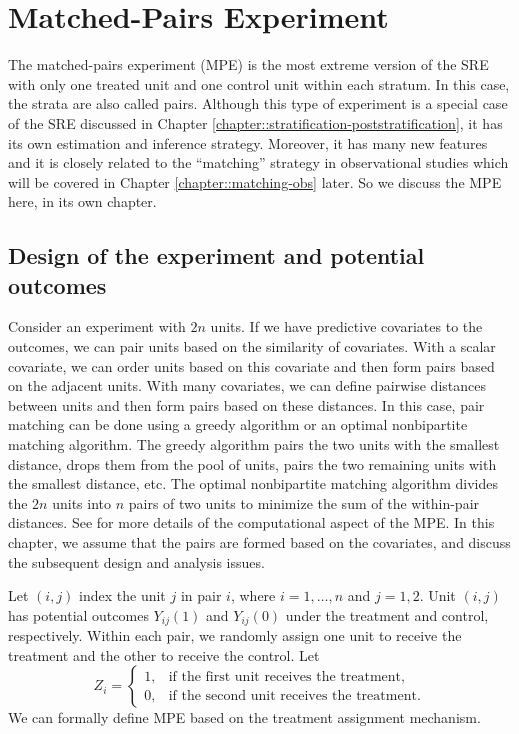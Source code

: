 
\chapter{Matched-Pairs Experiment}
 \label{chapter::mpe}
 
The matched-pairs experiment (MPE) is the most extreme version of the SRE with only one treated unit and one control unit within each stratum. In this case, the strata are also called pairs. Although this type of experiment is a special case of the SRE discussed in Chapter \ref{chapter::stratification-poststratification}, it has its own estimation and inference strategy. Moreover, it has many new features and it is closely related to the ``matching'' strategy in observational studies which will be covered in Chapter \ref{chapter::matching-obs} later. So we discuss the MPE here,  in its own chapter. 





\section{Design of the experiment and potential outcomes}
 
Consider an experiment with $2n$   units. If we have predictive covariates to the outcomes, we can pair units based on the similarity of covariates. With a scalar covariate, we can order units based on this covariate and then form pairs based on the adjacent units. With many covariates, we can define pairwise distances between units and then form pairs based on these distances. In this case, pair matching can be done using a greedy algorithm or an optimal nonbipartite matching algorithm. The greedy algorithm pairs the two units with the smallest distance, drops them from the pool of units, pairs the two remaining units with the smallest distance, etc. The optimal nonbipartite matching algorithm divides the $2n$ units into $n$ pairs of two units to minimize the sum of the within-pair distances. See \citet{greevy2004optimal} for more details of the computational aspect of the MPE. In this chapter, we assume that the pairs are formed based on the covariates, and discuss the subsequent design and analysis issues. 


 Let $(i,j)$ index the unit $j$ in pair $i$, where $i=1,\ldots, n$ and $j=1,2$. Unit $(i, j)$  has potential outcomes $Y_{ij}(1)$ and $Y_{ij}(0)$ under the treatment and control, respectively. Within each pair, we randomly assign one unit to receive the treatment and the other to receive the control. Let
$$
Z_i = \begin{cases}
   1,& \text{if the first unit receives the treatment}, \\
   0, & \text{if the second unit receives the treatment}. 
\end{cases}  
$$ 
We can formally define MPE based on the treatment assignment mechanism. 



